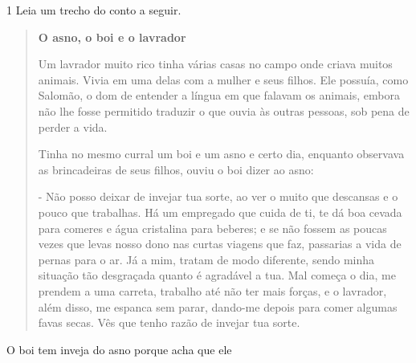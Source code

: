 \begin{esscolha}
\begin{esscolha}
\begin{esscolha}
\begin{esscolha}
\num{1} Leia um trecho do conto a seguir.

\begin{quote}
\textbf{O asno, o boi e o lavrador}

Um lavrador muito rico tinha várias casas no campo onde criava muitos
animais. Vivia em uma delas com a mulher e seus filhos. Ele possuía,
como Salomão, o dom de entender a língua em que falavam os animais,
embora não lhe fosse permitido traduzir o que ouvia às outras pessoas,
sob pena de perder a vida.

Tinha no mesmo curral um boi e um asno e certo dia, enquanto observava
as brincadeiras de seus filhos, ouviu o boi dizer ao asno:

- Não posso deixar de invejar tua sorte, ao ver o muito que descansas e
o pouco que trabalhas. Há um empregado que cuida de ti, te dá boa cevada
para comeres e água cristalina para beberes; e se não fossem as poucas
vezes que levas nosso dono nas curtas viagens que faz, passarias a vida
de pernas para o ar. Já a mim, tratam de modo diferente, sendo minha
situação tão desgraçada quanto é agradável a tua. Mal começa o dia, me
prendem a uma carreta, trabalho até não ter mais forças, e o lavrador,
além disso, me espanca sem parar, dando-me depois para comer algumas
favas secas. Vês que tenho razão de invejar tua sorte.

\end{quote}

O boi tem inveja do asno porque acha que ele

\end{esscolha}
\end{esscolha}
\end{esscolha}
\end{esscolha}
